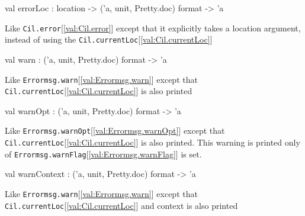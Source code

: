 \documentclass[11pt]{article}
\begin{document}
\label{val:Cil.errorLoc}\begin{ocamldoccode}
val errorLoc : location -> ('a, unit, Pretty.doc) format -> 'a
\end{ocamldoccode}
\begin{ocamldocdescription}
Like {\tt{Cil.error}}[\ref{val:Cil.error}] except that it explicitly takes a location argument, 
 instead of using the {\tt{Cil.currentLoc}}[\ref{val:Cil.currentLoc}]


\end{ocamldocdescription}




\label{val:Cil.warn}\begin{ocamldoccode}
val warn : ('a, unit, Pretty.doc) format -> 'a
\end{ocamldoccode}
\begin{ocamldocdescription}
Like {\tt{Errormsg.warn}}[\ref{val:Errormsg.warn}] except that {\tt{Cil.currentLoc}}[\ref{val:Cil.currentLoc}] is also printed


\end{ocamldocdescription}




\label{val:Cil.warnOpt}\begin{ocamldoccode}
val warnOpt : ('a, unit, Pretty.doc) format -> 'a
\end{ocamldoccode}
\begin{ocamldocdescription}
Like {\tt{Errormsg.warnOpt}}[\ref{val:Errormsg.warnOpt}] except that {\tt{Cil.currentLoc}}[\ref{val:Cil.currentLoc}] is also printed. 
 This warning is printed only of {\tt{Errormsg.warnFlag}}[\ref{val:Errormsg.warnFlag}] is set.


\end{ocamldocdescription}




\label{val:Cil.warnContext}\begin{ocamldoccode}
val warnContext : ('a, unit, Pretty.doc) format -> 'a
\end{ocamldoccode}
\begin{ocamldocdescription}
Like {\tt{Errormsg.warn}}[\ref{val:Errormsg.warn}] except that {\tt{Cil.currentLoc}}[\ref{val:Cil.currentLoc}] and context 
    is also printed


\end{ocamldocdescription}
\end{document}
